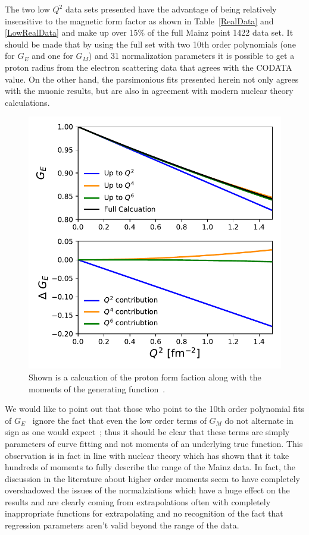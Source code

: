 \documentclass[10pt,aps,prc,twocolumn]{revtex4-1}
\begin{document}
The two low $Q^2$ data sets presented have the advantage of being relatively insensitive to the magnetic form 
factor as shown in Table~\ref{RealData} and \ref{LowRealData} and make up over
15\% of the full Mainz point 1422 data set.   It should be made that by using the full set with two 10th order polynomials
(one for $G_E$ and one for $G_M$) and 31 normalization parameters it is possible to get a proton radius from the electron
scattering data that agrees with the 
CODATA value.     On the other hand,  the parsimonious fits presented herein not only agrees with the muonic results, 
but are also in agreement with modern nuclear theory calculations.

\begin{figure}
\includegraphics[width=\columnwidth]{Figure/RealMoments.pdf}
\caption{Shown is a calcuation of the proton form faction along with the moments of the generating 
function~\cite{Alarcon:2017lhg}.}
\end{figure}

We would like to point out that those who point to the 10th order polynomial fits of $G_E$~\cite{Sick:2017aor,Sick:2018fzn}
ignore the fact that even the low order terms of $G_M$ do not alternate in sign as one would expect~\cite{Bernauer:2010zga}; 
thus it should be clear that these terms are simply parameters of curve fitting and not 
moments of an underlying true function.   This observation is in fact in line with nuclear theory which has shown 
that it take hundreds of moments to fully describe the range of the Mainz data.
In fact, the discussion in the literature about higher order moments seem to have
completely overshadowed the issues of the normalziations which have a huge effect on the results and are clearly 
coming from extrapolations often with completely inappropriate functions for extrapolating and no recognition of the fact
that regression parameters aren't valid beyond the range of the data.
\end{document}
